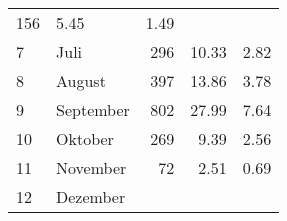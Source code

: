 \begin{longtable}{lXrrr}
       \num{156} &
       \num[round-mode=places,round-precision=2]{5.45} &
         \num[round-mode=places,round-precision=2]{1.49} \\

     7 &
     \multicolumn{1}{X}{ Juli   } &


       \num{296} &
       \num[round-mode=places,round-precision=2]{10.33} &
         \num[round-mode=places,round-precision=2]{2.82} \\

     8 &
     \multicolumn{1}{X}{ August   } &


       \num{397} &
       \num[round-mode=places,round-precision=2]{13.86} &
         \num[round-mode=places,round-precision=2]{3.78} \\

     9 &
     \multicolumn{1}{X}{ September   } &


       \num{802} &
       \num[round-mode=places,round-precision=2]{27.99} &
         \num[round-mode=places,round-precision=2]{7.64} \\

     10 &
     \multicolumn{1}{X}{ Oktober   } &


       \num{269} &
       \num[round-mode=places,round-precision=2]{9.39} &
         \num[round-mode=places,round-precision=2]{2.56} \\

     11 &
     \multicolumn{1}{X}{ November   } &


       \num{72} &
       \num[round-mode=places,round-precision=2]{2.51} &
         \num[round-mode=places,round-precision=2]{0.69} \\

     12 &
     \multicolumn{1}{X}{ Dezember   } &



\end{longtable}
